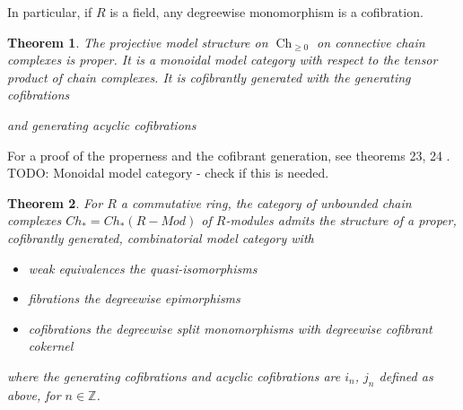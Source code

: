 \documentclass{scrartcl}
\theoremstyle{plain}
\newtheorem{theorem}{Theorem}[section]
\theoremstyle{definition}
\newcommand{\Z}{\mathbb Z}
\DeclareMathOperator{\Ch}{Ch}
\begin{document}
In particular, if $R$ is a field, any degreewise monomorphism is a cofibration.

\begin{theorem}
    The projective model structure on $\Ch_{\geq 0}$ on connective chain complexes is proper. It is a monoidal model category with respect to the tensor product of chain complexes. It is cofibrantly generated with the generating cofibrations

    \begin{center}
    \end{center}

  and generating acyclic cofibrations
    \begin{center}
    \end{center}
    \end{theorem}
For a proof of the properness and the cofibrant generation, see theorems 23, 24 \cite{strickland2020model}. TODO: Monoidal model category - check if this is needed.

\begin{theorem}
    For $R$ a commutative ring, the category of unbounded chain complexes $Ch_* = Ch_*(R-Mod)$ of $R$-modules admits the structure of a proper, cofibrantly generated, combinatorial model category with 
    \begin{itemize}
        \item weak equivalences the quasi-isomorphisms
        \item fibrations the degreewise epimorphisms
        \item cofibrations the degreewise split monomorphisms with degreewise cofibrant cokernel
    \end{itemize}
    where the generating cofibrations and acyclic cofibrations are $i_n$, $j_n$ defined as above, for $n\in\Z$.
\end{theorem}
\end{document}
